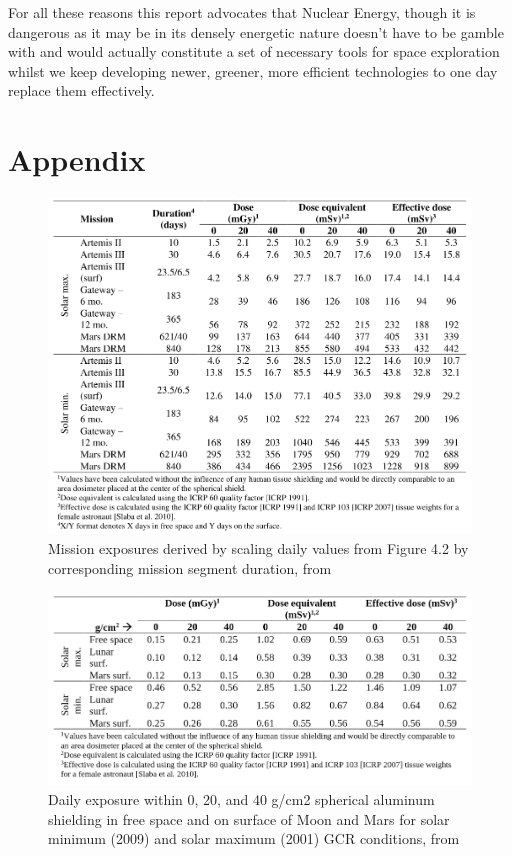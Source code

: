 \documentclass[12pt,a4paper]{report}
\begin{document}
For all these reasons this report advocates that Nuclear Energy, though it is dangerous as it may be in its densely energetic nature doesn't have to be gamble with and would actually constitute a set of necessary tools for space exploration whilst we keep developing newer, greener, more efficient technologies to one day replace them effectively.





\chapter{Appendix}

\begin{figure}[hbtp]
\centering
\includegraphics[width=1\textwidth]{img/extrapo.png}
\caption{Mission exposures derived by scaling daily values from Figure 4.2 by corresponding mission segment duration, from \citet{hoffman1997}}
\end{figure}

\begin{figure}[hbtp]
\centering
\includegraphics[width=1\textwidth]{img/data.png}
\caption{Daily exposure within 0, 20, and 40 g/cm2 spherical aluminum shielding in free space and on surface of Moon and Mars for solar minimum (2009) and solar maximum (2001) GCR conditions, from \citet{hoffman1997}}
\end{figure}
\end{document}
